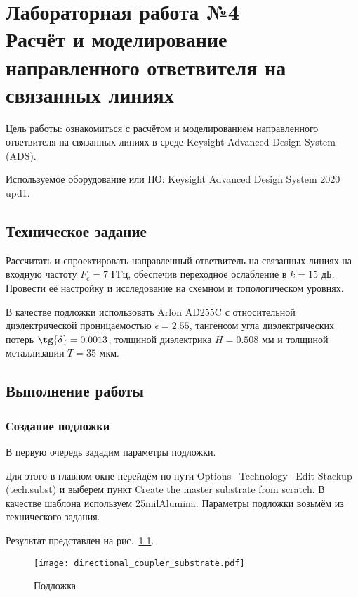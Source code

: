 \chapter{Лабораторная работа №4 \\
Расчёт и моделирование направленного ответвителя на связанных линиях}

Цель работы: ознакомиться с расчётом и моделированием направленного ответвителя на связанных линиях в среде Keysight Advanced Design System (ADS).

Используемое оборудование или ПО: Keysight Advanced Design System 2020 upd1.

\section{Техническое задание}

Рассчитать и спроектировать направленный ответвитель на связанных линиях на входную частоту $F_c = 7 \text{~ГГц}$, обеспечив переходное ослабление в $k = 15 \text{~дБ}$.
Провести её настройку и исследование на схемном и топологическом уровнях.

В качестве подложки использовать Arlon AD255C с относительной диэлектрической проницаемостью $\epsilon = 2.55$, тангенсом угла диэлектрических потерь $\tg{\delta} = 0.0013$, толщиной диэлектрика $H = 0.508 \text{~мм}$ и толщиной металлизации $T = 35 \text{~мкм}$.

\section{Выполнение работы}

\subsection{Создание подложки}

В первую очередь зададим параметры подложки.

Для этого в главном окне перейдём по пути Options \textrightarrow\ Technology \textrightarrow\ Edit Stackup (tech.subst) и выберем пункт Create the master substrate from scratch.
В качестве шаблона используем 25milAlumina.
Параметры подложки возьмём из технического задания.

Результат представлен на рис.~\ref{fig:directional_coupler_substrate}.

\begin{figure}
    \centering
    \texttt{[image: directional\_coupler\_substrate.pdf]}
    \caption{Подложка}%
    \label{fig:directional_coupler_substrate}
\end{figure}

